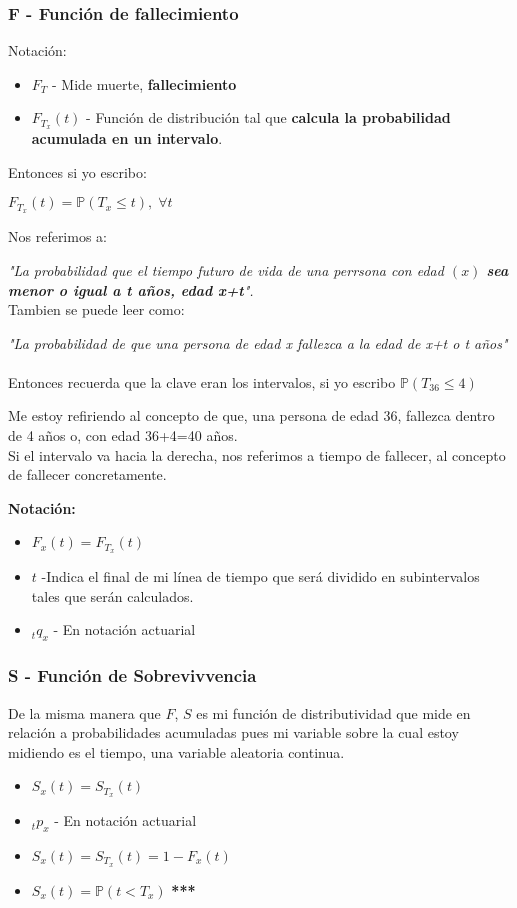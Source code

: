 \documentclass{article}
\begin{document}
\subsubsection*{F - Función de fallecimiento}
Notación:
\begin{itemize}
    \item \(F_T\) - Mide muerte, \textbf{fallecimiento} 
    \item \(F_{T_x}(t)\) - Función de distribución tal que \textbf{calcula la probabilidad acumulada en un intervalo}.
\end{itemize}
Entonces si yo escribo:

\(F_{T_x}(t)=\mathbb{P}(T_x \leq t ),\;\forall t\)

Nos referimos a:

\textit{"La probabilidad que el tiempo futuro de vida de una perrsona con edad \((x)\) \textbf{sea menor o igual a t años, edad x+t}".}
\\

Tambien se puede leer como:

\textit{"La probabilidad de que una persona de edad x fallezca a la edad de x+t o t años"}
\\\\
Entonces recuerda que la clave eran los intervalos, si yo escribo \(\mathbb{P}(T_{36} \leq 4)\)

Me estoy refiriendo al concepto de que, una persona de edad 36, fallezca dentro de 4 años o, con edad 36+4=40 años.
\\
Si el intervalo va hacia la derecha, nos referimos a tiempo de fallecer, al concepto de fallecer concretamente.

\textbf{Notación:}
\begin{itemize}
    \item \(F_x(t) = F_{T_x}(t)\)
    \item \(t\) -Indica el final de mi línea de tiempo que será dividido en subintervalos tales que serán calculados.
    \item \({}_tq_x\) - En notación actuarial
\end{itemize}
\subsubsection*{S - Función de Sobrevivvencia}

De la misma manera que \(F\), \(S\) es mi función de distributividad que mide en relación a probabilidades acumuladas pues mi variable sobre la cual estoy midiendo es el tiempo, una variable aleatoria continua.
\begin{itemize}
    \item \(S_x(t) = S_{T_x}(t)\)
    \item \({}_tp_x\) - En notación actuarial
    \item \(S_x(t) = S_{T_x}(t) = 1-F_x(t)\)
    \item \(S_x(t) = \mathbb{P}(t<T_x)\) \textbf{***}
    
\end{itemize}
\end{document}
